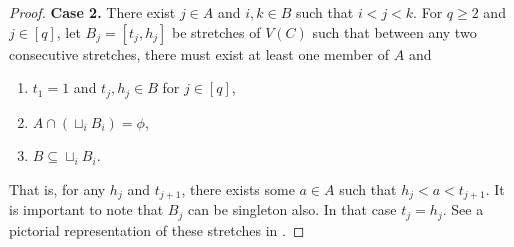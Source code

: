 \documentclass[12pt]{article}
\theoremstyle{definition}
\begin{document}
\begin{proof}
\textbf{Case 2.} There exist $j\in A$ and $i,k\in B$ such that $i<j<k$.
For $q\geq 2$ and $j\in [q]$, let $B_j=[t_j, h_j]$ be stretches of $V(C)$ such that between any two consecutive stretches, there must exist at least one member of $A$ and
\begin{enumerate}
    \item $t_{1}=1$ and $t_{j}, h_{j}\in B$ for $j\in[q]$, 
    \item $A\cap (\sqcup_iB_i)=\phi$,
    \item $B\subseteq \sqcup_iB_i$.
\end{enumerate}


 That is, for any $h_{j}$ and $t_{j+1}$, there exists some $a\in A$ such that $h_{j}<a<t_{j+1}$. It is important to note that $B_{j} $ can be singleton also. In that case $t_{j}=h_{j}$. See a pictorial representation of these stretches in .


\end{proof}
\end{document}
